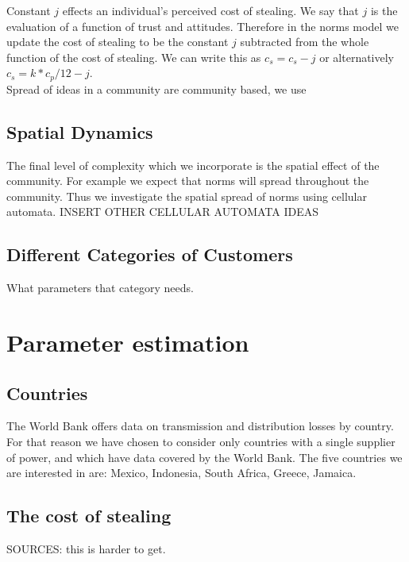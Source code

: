 \documentclass{article}
\begin{document}
Constant $j$ effects an individual's perceived cost of stealing. We say that $j$ is the evaluation of a function of trust and attitudes. Therefore in the norms model we update the cost of stealing to be the constant $j$ subtracted from the whole function of the cost of stealing. We can write this as $c_s=c_s-j$ or alternatively
 $c_s=k*c_p/12 - j$.
                                                                                                                                                                                                                                           \\

Spread of ideas in a community are community based, we use 



\subsection{Spatial Dynamics}
The final level of complexity which we incorporate is the spatial effect of the community. For example we expect that norms will spread throughout the community. Thus we investigate the spatial spread of norms using cellular automata. 
INSERT OTHER CELLULAR AUTOMATA IDEAS 

\subsection{Different Categories of Customers}
What parameters that category needs. 

\section{Parameter estimation}

\subsection{Countries}
The World Bank offers data on transmission and distribution losses by country. For that reason we have chosen to consider only countries with a single supplier of power, and which have data covered by the World Bank.  The five countries we are interested in are: Mexico, Indonesia, South Africa, Greece, Jamaica. 


\subsection{The cost of stealing}
SOURCES:  this is harder to get. 
\end{document}
